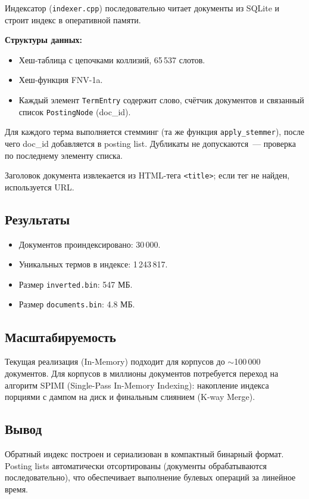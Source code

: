 \documentclass[12pt,a4paper]{article}
\begin{document}
Индексатор (\texttt{indexer.cpp}) последовательно читает документы из SQLite и строит индекс в оперативной памяти.

\textbf{Структуры данных:}
\begin{itemize}
    \item Хеш-таблица с цепочками коллизий, 65\,537 слотов.
    \item Хеш-функция FNV-1a.
    \item Каждый элемент \texttt{TermEntry} содержит слово, счётчик документов и связанный список \texttt{PostingNode} (doc\_id).
\end{itemize}

Для каждого терма выполняется стемминг (та же функция \texttt{apply\_stemmer}), после чего doc\_id добавляется в posting list. Дубликаты не допускаются~--- проверка по последнему элементу списка.

Заголовок документа извлекается из HTML-тега \texttt{<title>}; если тег не найден, используется URL.

\subsection{Результаты}

\begin{itemize}
    \item Документов проиндексировано: 30\,000.
    \item Уникальных термов в индексе: 1\,243\,817.
    \item Размер \texttt{inverted.bin}: 547 МБ.
    \item Размер \texttt{documents.bin}: 4.8 МБ.
\end{itemize}

\subsection{Масштабируемость}

Текущая реализация (In-Memory) подходит для корпусов до $\sim$100\,000 документов. Для корпусов в миллионы документов потребуется переход на алгоритм SPIMI (Single-Pass In-Memory Indexing): накопление индекса порциями с дампом на диск и финальным слиянием (K-way Merge).

\subsection{Вывод}

Обратный индекс построен и сериализован в компактный бинарный формат. Posting lists автоматически отсортированы (документы обрабатываются последовательно), что обеспечивает выполнение булевых операций за линейное время.
\end{document}
